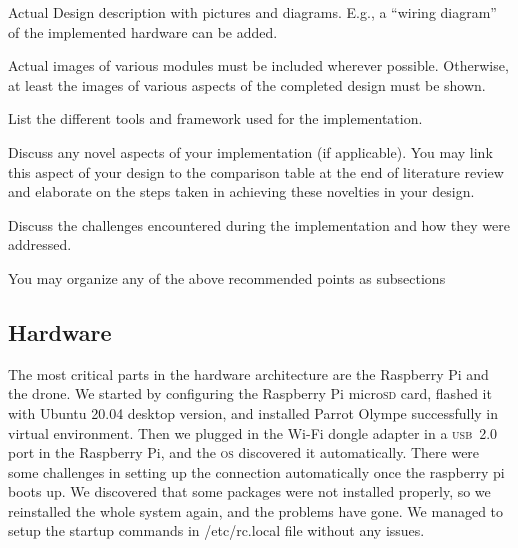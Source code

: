 \documentclass[../main.tex]{subfiles}
\begin{document}
\begin{newrequirements}
    \begin{todolist}
    \item Actual Design description with pictures 
        and diagrams. E.g., a “wiring diagram” 
        of the implemented hardware can be 
        added. 

    \item Actual images of various modules must 
        be included wherever possible. 
        Otherwise, at least the images of 
        various aspects of the completed design 
        must be shown. 

    \item List the different tools and framework 
        used for the implementation. 

    \item Discuss any novel aspects of your 
        implementation (if applicable). You may 
        link this aspect of your design to the 
        comparison table at the end of 
        literature review and elaborate on the 
        steps taken in achieving these 
        novelties in your design. 

    \item Discuss the challenges encountered 
        during the implementation and how they 
        were addressed. 

    \item You may organize any of the above 
        recommended points as subsections 

    \end{todolist}
\end{newrequirements}

\subsection{Hardware}

The most critical parts in the hardware
architecture are the Raspberry Pi and the drone. 
We started by configuring the Raspberry Pi micro\textsc{sd} card,
flashed it with Ubuntu 20.04 desktop version,
and installed Parrot Olympe successfully in virtual environment. 
Then we plugged in the Wi-Fi dongle adapter
in a \textsc{usb}~2.0 port in the Raspberry Pi, 
and the \textsc{os} discovered it automatically. 
There were some challenges in setting up the connection automatically 
once the raspberry pi boots up. We discovered that some packages were not installed properly,
so we reinstalled the whole system again, and the problems have gone. 
We managed to setup the startup commands in /etc/rc.local file without any issues.
\end{document}
